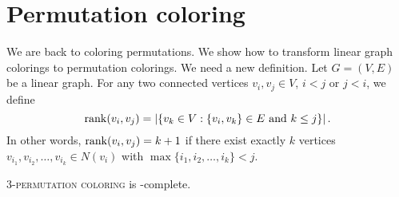 \section{Permutation coloring}
\label{section:Permutation coloring}

We are back to coloring permutations. We show how to transform
linear graph colorings to permutation colorings.
We need a new definition.
Let $G = (V, E)$ be a linear graph. For any two connected vertices
$v_i, v_j \in V$, $i < j$ or $j < i$,
we define
$$
\operatorname{rank}(v_i, v_j) = \left|\left\{v_k \in V : \{v_i, v_k\} \in E \text{ and } k \leq j\right\}\right|.
$$
In other words, $\operatorname{rank}(v_i, v_j) = k+1$ if there exist exactly $k$ vertices
$v_{i_1}, v_{i_2}, \dots, v_{i_k} \in N(v_i)$
with $\max \{i_1, i_2, \dots, i_k\} < j$.

\begin{proposition}
  \label{proposition:3-permutation coloring is NP-complete}
  \textsc{$3$-permutation coloring} is \NP-complete.
\end{proposition}

